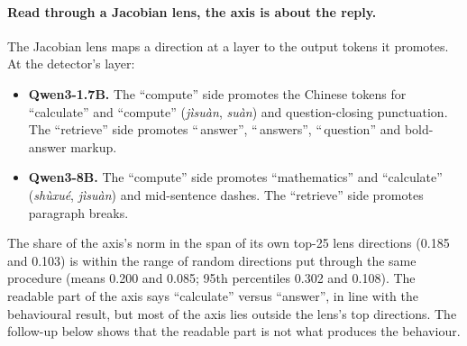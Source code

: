 \documentclass[11pt]{article}
\begin{document}
\paragraph{Read through a Jacobian lens, the axis is about the reply.} The Jacobian lens \citep{anthropic2026workspace} maps a direction at a layer to the output tokens it promotes. At the detector's layer:
\begin{itemize}
  \item \textbf{Qwen3-1.7B.} The ``compute'' side promotes the Chinese tokens for ``calculate'' and ``compute'' (\emph{jìsuàn}, \emph{suàn}) and question-closing punctuation. The ``retrieve'' side promotes ``\,answer'', ``\,answers'', ``\,question'' and bold-answer markup.
  \item \textbf{Qwen3-8B.} The ``compute'' side promotes ``mathematics'' and ``calculate'' (\emph{shùxué}, \emph{jìsuàn}) and mid-sentence dashes. The ``retrieve'' side promotes paragraph breaks.
\end{itemize}
The share of the axis's norm in the span of its own top-25 lens directions (0.185 and 0.103) is within the range of random directions put through the same procedure (means 0.200 and 0.085; 95th percentiles 0.302 and 0.108). The readable part of the axis says ``calculate'' versus ``answer'', in line with the behavioural result, but most of the axis lies outside the lens's top directions. The follow-up below shows that the readable part is not what produces the behaviour.
\end{document}
